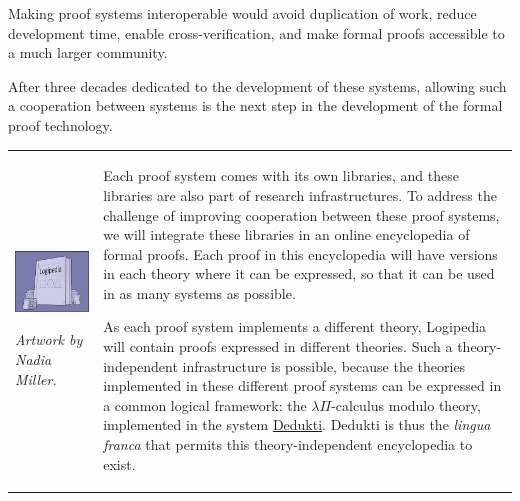 Making proof systems interoperable would avoid duplication of work,
reduce development time, enable cross-verification, and make formal
proofs accessible to a much larger community.  

After three decades
dedicated to the development of these systems, allowing such a
cooperation between systems is the next step in the development of the
formal proof technology.

\medskip

\hspace{-0.8cm}
\begin{tabular}{p{}p{}}
\begin{minipage}{7cm}

\includegraphics[width=7cm]{Illustration3_Color.jpg}

{\em \small Artwork by Nadia Miller.}

\end{minipage}
&
\begin{minipage}{9.85cm}
\hspace{0.4cm} Each proof system comes with its own libraries, and
these libraries are also part of research infrastructures. To address
the challenge of improving cooperation between these proof systems, we
will integrate these libraries in an online encyclopedia of formal
proofs. Each proof in this encyclopedia will have versions in each
theory where it can be expressed, so that it can be used in as many
systems as possible.  

\hspace{0.4cm} As each proof system implements a different theory,
Logipedia will contain proofs expressed in different theories.  Such a
theory-independent infrastructure is possible, because the
theories implemented in these different proof systems can be expressed
in a common logical framework: the $\lambda \Pi$-calculus modulo
theory, implemented in the system
\href{https://deducteam.github.io/}{Dedukti}. Dedukti is thus the {\em
  lingua franca} that permits this theory-independent encyclopedia to
exist.
\end{minipage}
\\
\end{tabular}

